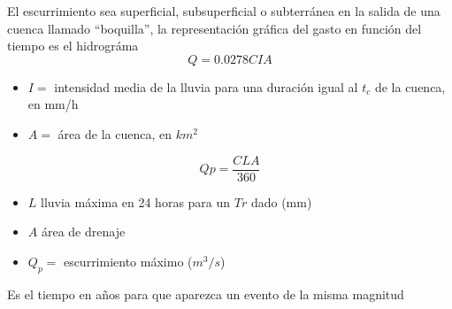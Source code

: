     El escurrimiento sea superficial, subsuperficial o subterránea en la salida de una cuenca llamado ``boquilla'', la representación gráfica del gasto en función del tiempo es el hidrográma
    \begin{equation}
        Q=0.0278CIA
    \end{equation}
    \begin{notation}
        \begin{itemize}
            \item $I=$ intensidad media de la lluvia para una duración igual al $t_c$ de la cuenca, en mm/h
            \item $A=$ área de la cuenca, en $km^2$
        \end{itemize}
    \end{notation}
    \begin{equation}
        Qp=\frac{CLA}{360}
    \end{equation}
    \begin{notation}
        \begin{itemize}
            \item $L$ lluvia máxima en 24 horas para un $Tr$ dado (mm)
            \item $A$ área de drenaje
            \item $Q_p=$ escurrimiento máximo ($m^3/s$)
        \end{itemize}
    \end{notation}
    Es el tiempo en años para que aparezca un evento de la misma magnitud
    
